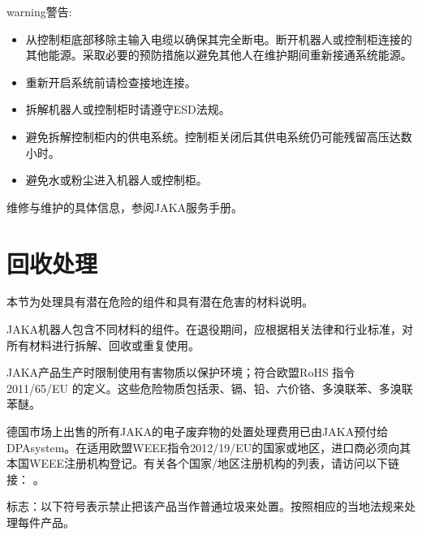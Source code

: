 \documentclass[a4paper,11pt,english,openany,oneside]{sphinxmanual}
\begin{document}
\begin{sphinxadmonition}{warning}{警告:}\begin{itemize}
\item {} 
\sphinxAtStartPar
从控制柜底部移除主输入电缆以确保其完全断电。断开机器人或控制柜连接的其他能源。采取必要的预防措施以避免其他人在维护期间重新接通系统能源。

\item {} 
\sphinxAtStartPar
重新开启系统前请检查接地连接。

\item {} 
\sphinxAtStartPar
拆解机器人或控制柜时请遵守ESD法规。

\item {} 
\sphinxAtStartPar
避免拆解控制柜内的供电系统。控制柜关闭后其供电系统仍可能残留高压达数小时。

\item {} 
\sphinxAtStartPar
避免水或粉尘进入机器人或控制柜。

\end{itemize}
\end{sphinxadmonition}

\sphinxAtStartPar
维修与维护的具体信息，参阅JAKA服务手册。

\sphinxstepscope


\chapter{回收处理}
\label{\detokenize{10 _u56de_u6536_u5904_u7406:id1}}\label{\detokenize{10 _u56de_u6536_u5904_u7406::doc}}
\sphinxAtStartPar
本节为处理具有潜在危险的组件和具有潜在危害的材料说明。

\sphinxAtStartPar
JAKA机器人包含不同材料的组件。在退役期间，应根据相关法律和行业标准，对所有材料进行拆解、回收或重复使用。

\sphinxAtStartPar
{}

\sphinxAtStartPar
JAKA产品生产时限制使用有害物质以保护环境；符合欧盟RoHS 指令2011/65/EU 的定义。这些危险物质包括汞、镉、铅、六价铬、多溴联苯、多溴联苯醚。

\sphinxAtStartPar
{}

\sphinxAtStartPar
德国市场上出售的所有JAKA的电子废弃物的处置处理费用已由JAKA预付给DPA\sphinxhyphen{}system。在适用欧盟WEEE指令2012/19/EU的国家或地区，进口商必须向其本国WEEE注册机构登记。有关各个国家/地区注册机构的列表，请访问以下链接：  。

\sphinxAtStartPar
标志：以下符号表示禁止把该产品当作普通垃圾来处置。按照相应的当地法规来处理每件产品。
\end{document}

